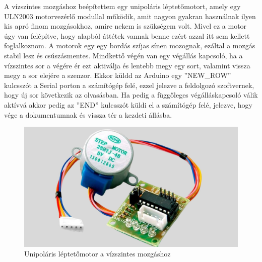 \documentclass[]{thesis-ekf}
\theoremstyle{definition}
\theoremstyle{remark}
\begin{document}
A vízszintes mozgáshoz beépítettem egy unipoláris léptetőmotort, amely egy ULN2003 motorvezérlő modullal működik, amit nagyon gyakran használnak ilyen kis apró finom mozgásokhoz, amire nekem is szükségem volt. Mivel ez a motor úgy van felépítve, hogy alapból áttétek vannak benne ezért azzal itt sem kellett foglalkoznom. A motorok egy egy bordás szíjas sínen mozognak, ezáltal a mozgás stabil lesz és csúszásmentes. Mindkettő végén van egy végállás kapcsoló, ha a vízszintes sor a végére ér ezt aktiválja és lentebb megy egy sort, valamint vissza megy a sor elejére a szenzor. Ekkor küldd az Arduino egy ''NEW\_ROW'' kulcsszót a Serial porton a számítógép felé, ezzel jelezve a feldolgozó szoftvernek, hogy új sor következik az olvasásban. Ha pedig a függőleges végálláskapcsoló válik aktívvá akkor pedig az ''END'' kulcsszót küldi el a számítógép felé, jelezve, hogy vége a dokumentumnak és vissza tér a kezdeti állásba.

\begin{figure}[th!]
	\centering
	\includegraphics[width=0.5\linewidth]{28BYJ-48-modul-ULN2003}
	\caption[Unipoláris léptetőmotor]{Unipoláris léptetőmotor a vízszintes mozgáshoz}
	\label{fig:28byj-48-modul-uln2003}
\end{figure}

 
\end{document}

